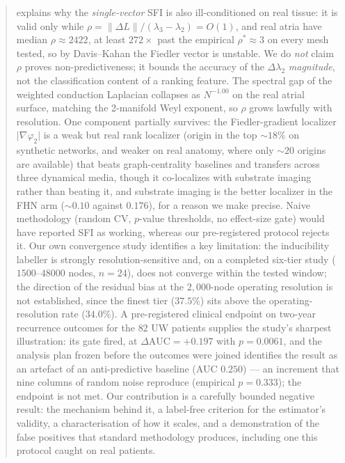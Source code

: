 \documentclass[11pt]{article}
\theoremstyle{definition}
\newcommand{\lam}{\lambda}
\newcommand{\phii}{\varphi}
\newcommand{\rhoval}{\rho}
\newcommand{\dAUC}{\Delta\mathrm{AUC}}
\begin{document}
\begin{abstract}
explains why the \emph{single-vector} SFI is also ill-conditioned on real
tissue: it is valid only while
$\rhoval=\lVert\Delta L\rVert/(\lam_3-\lam_2)=O(1)$, and real atria have
median $\rhoval\approx 2422$, at least $272\times$ past the empirical
$\rhoval^\ast\approx 3$ on every mesh tested, so by Davis--Kahan the Fiedler
vector is unstable. We do \emph{not} claim $\rhoval$ proves non-predictiveness;
it bounds the accuracy of the $\Delta\lam_2$ \emph{magnitude}, not the
classification content of a ranking feature. The spectral gap of the weighted
conduction Laplacian collapses as $N^{-1.00}$ on the real atrial surface,
matching the 2-manifold Weyl exponent, so $\rhoval$ grows lawfully with
resolution. One component partially survives: the
Fiedler-gradient localizer $\lvert\nabla\phii_2\rvert$ is a weak but real rank
localizer (origin in the top $\sim\!18\%$ on synthetic networks, and weaker on
real anatomy, where only $\sim\!20$ origins are available) that beats
graph-centrality baselines and transfers across three dynamical media, though it
co-localizes with substrate imaging rather than beating it, and substrate
imaging is the better localizer in the FHN arm ($\sim\!0.10$ against $0.176$),
for a reason we make precise. Naive methodology (random CV, $p$-value
thresholds, no effect-size gate) would have reported SFI as working, whereas our
pre-registered protocol rejects it. Our own convergence study identifies a key
limitation: the inducibility labeller is strongly resolution-sensitive and, on a
completed six-tier study ($1500$--$48000$ nodes, $n=24$), does not converge
within the tested window; the direction of the residual bias at the
$2{,}000$-node operating resolution is not established, since the finest tier
($37.5\%$) sits above the operating-resolution rate ($34.0\%$). A pre-registered
clinical endpoint on two-year recurrence outcomes for the $82$ UW patients
supplies the study's sharpest illustration: its gate fired, at $\dAUC=+0.197$
with $p=0.0061$, and the analysis plan frozen before the outcomes were joined
identifies the result as an artefact of an anti-predictive baseline (AUC
$0.250$) --- an increment that nine columns of random noise reproduce (empirical
$p=0.333$);
the endpoint is not met. Our contribution is a carefully bounded negative
result: the mechanism behind it, a label-free criterion for the estimator's
validity, a characterisation of how it scales, and a demonstration of the false
positives that standard methodology produces, including one this protocol caught
on real patients.
\end{abstract}
\end{document}
